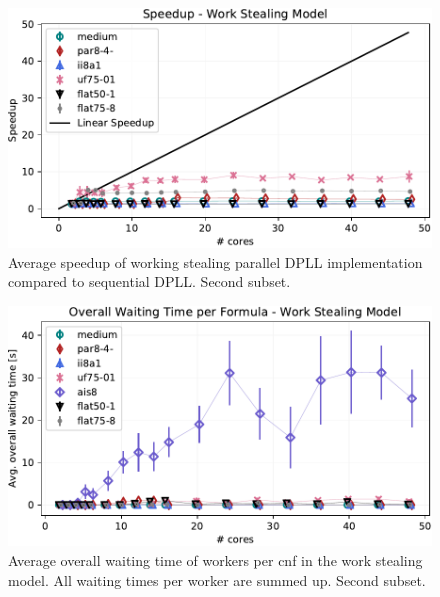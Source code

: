 \documentclass[letterpaper]{article}
\begin{document}
\begin{figure}[p]
    \centering
    \includegraphics[width=\columnwidth]{figures/scaling_stealing_non_subset_dpll_scaling_tar.pdf}
    \caption{Average speedup of working stealing parallel DPLL implementation compared to sequential DPLL.
    Second subset.}
    \label{fig:dpll_stealing_speedup_non}
\end{figure}

\begin{figure}[p]
    \centering
    \includegraphics[width=\columnwidth]{figures/waiting_stealing_non_subset_dpll_scaling_tar.pdf}
    \caption{Average overall waiting time of workers per cnf in the work stealing model.
    All waiting times per worker are summed up.
    Second subset.}
    \label{fig:dpll_stealing_waiting_non}
\end{figure}
\end{document}
